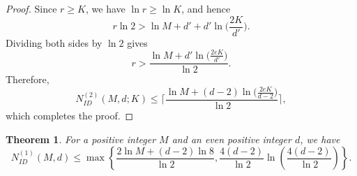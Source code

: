 \documentclass[11 pt]{article}
\numberwithin{equation}{section}
\newtheorem{theorem}{Theorem}[section]
\begin{document}
\begin{proof}
        Since $r \ge K$, we have $\ln r \ge \ln K$, and hence
        \[
        r\ln 2 > \ln M + d' + d'\ln\!\Big(\frac{2K}{d'}\Big).
        \]
        Dividing both sides by $\ln 2$ gives
        \[
            r > \frac{ \ln M + d'\ln\!\Big(\frac{2eK}{d'}\Big) }{\ln 2}.
        \]
        Therefore,
        \[
        N_{ID}^{(2)}(M,d;K)
        \le
        \Bigg\lceil
        \frac{
        \ln M + (d-2)\ln\!\Big(\frac{2eK}{d-2}\Big)}{\ln 2}\Bigg\rceil,
        \]
        which completes the proof.
    \end{proof}

    \begin{theorem}
    \label{N1_M_d_bound}
    For a positive integer $M$ and an even positive integer $d$, we have
    \[
    N^{(1)}_{ID}(M,d) \le \max\left\{
    \frac{2\ln M + (d-2)\ln 8}{\ln 2},
    \frac{4(d-2)}{\ln 2} \ln\!\left(\frac{4(d-2)}{\ln 2}\right)
    \right\}.
    \]
    \end{theorem}
\end{document}
